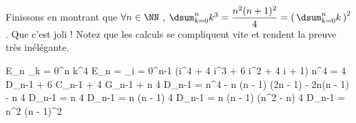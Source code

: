 \medskip


Finissons en montrant que
$\forall n \in \NN$ , $\dsum_{k = 0}^{n} k^3 = \dfrac{n^2 (n + 1)^2}{4} = \left( \, \dsum_{k = 0}^{n} k \, \right)^2$ . Que c'est joli !
Notez que les calculs se compliquent vite et rendent la preuve très inélégante.

\medskip

\begin{stepcalc}[style = sar, ope = \iff]
	E_n \eq[def]  \dsum_{k = 0}^{n} k^4
		\explnext{}
	E_n = \dsum_{i = 0}^{n-1} (i^4 + 4 i^3 + 6 i^2 + 4 i + 1)
		\explnext{}
	n^4 = 4 D_{n-1} + 6 C_{n-1} + 4 G_{n-1} + n
		\explnext{}
	4 D_{n-1} = n^4 - n (n - 1) (2n - 1) - 2n(n - 1) - n
		\explnext{}
	4 D_{n-1} = n \cdot {}
	4 D_{n-1} = n (n - 1) \cdot {}
		\explnext{}
	4 D_{n-1} = n (n - 1) (n^2 - n)
		\explnext{}
	4 D_{n-1} = n^2 (n - 1)^2
\end{stepcalc}


